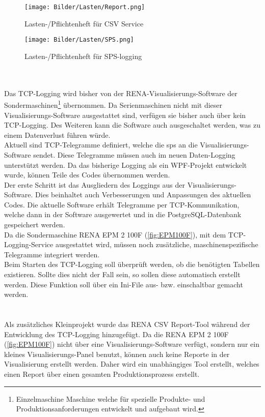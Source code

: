 \begin{figure}
\centering
 \texttt{[image: Bilder/Lasten/Report.png]}
 \caption[Lasten-/Pflichtenheft für \glqq CSV Service\grqq{}]{Lasten-/Pflichtenheft für \glqq CSV Service\grqq{}}
 \label{fig:lasten2}
\end{figure}
\begin{figure}
\centering
 \texttt{[image: Bilder/Lasten/SPS.png]}
 \caption[Lasten-/Pflichtenheft für \glqq SPS-Logging\grqq{}]{Lasten-/Pflichtenheft für \glqq SPS-logging\grqq{}}
 \label{fig:lasten3}
\end{figure}
\ \\
\textbf{}
\ \\
Das TCP-Logging wird bisher von der RENA-Visualisierungs-Software der Sondermaschinen\footnote[1]{Einzelmaschine Maschine welche für spezielle Produkte- und Produktionsanforderungen entwickelt und aufgebaut wird.}  übernommen. Da Serienmaschinen nicht mit dieser Visualisierungs-Software ausgestattet sind, verfügen sie bisher auch über kein TCP-Logging. Des Weiteren kann die Software auch ausgeschaltet werden, was zu einem Datenverlust führen würde. 
\ \\
Aktuell sind TCP-Telegramme definiert, welche die \ac{sps} an die Visualisierungs-Software sendet. Diese Telegramme müssen auch im neuen Daten-Logging unterstützt werden. 
Da das bisherige Logging als ein WPF-Projekt entwickelt wurde, können Teile des Codes übernommen werden. 
\ \\
Der erste Schritt ist das Ausgliedern des Loggings aus der Visualisierungs-Software. Dies beinhaltet auch Verbesserungen und Anpassungen des aktuellen Codes. Die aktuelle Software erhält Telegramme per TCP-Kommunikation, welche dann in der Software ausgewertet und in die PostgreSQL-Datenbank gespeichert werden.
\ \\
Da die Sondermaschine \glqq RENA EPM 2 100F\grqq{} (\autoref{fig:EPM100F}), mit dem TCP-Logging-Service ausgestattet wird, müssen noch zusätzliche, maschinenspezifische Telegramme integriert werden.
\ \\
Beim Starten des TCP-Logging soll überprüft werden, ob die benötigten Tabellen existieren. Sollte dies nicht der Fall sein, so sollen diese automatisch erstellt werden. Diese Funktion soll über ein Ini-File aus- bzw. einschaltbar gemacht werden.
\ \\
\ \\
\textbf{}
\ \\
Als zusätzliches \glqq Kleinprojekt\grqq{} wurde das \glqq RENA CSV Report\grqq{}-Tool während der Entwicklung des TCP-Logging hinzugefügt. Da die \glqq RENA EPM 2 100F\grqq{} (\autoref{fig:EPM100F}) nicht über eine Visualisierungs-Software verfügt, sondern nur ein kleines Visualisierungs-Panel benutzt, können auch keine Reporte in der Visualisierung erstellt werden. Daher wird ein unabhängiges Tool erstellt, welches einen Report über einen gesamten Produktionsprozess erstellt.
